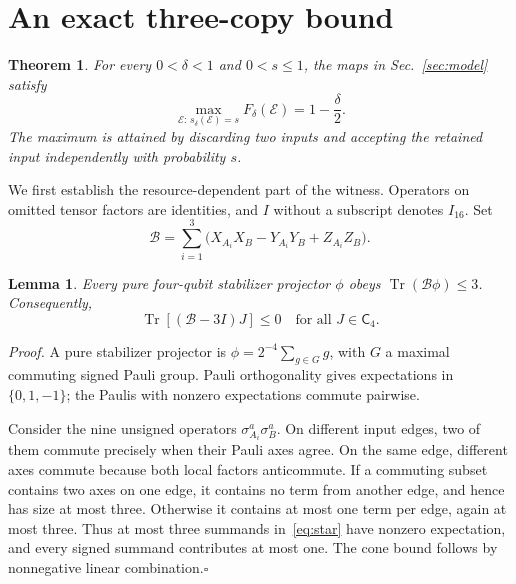 \documentclass[aps,pra,reprint,amsmath,amssymb,longbibliography,nofootinbib]{revtex4-2}
\newcommand{\Tr}{\operatorname{Tr}}
\newcommand{\cE}{\mathcal E}
\newcommand{\cB}{\mathcal B}
\newcommand{\Cs}{\mathsf C}
\newtheorem{theorem}{Theorem}
\newtheorem{lemma}{Lemma}
\begin{document}
\section{An exact three-copy bound}
\label{sec:proof}

\begin{theorem}
\label{thm:main}
For every $0<\delta<1$ and $0<s\leq1$, the maps in Sec.~\ref{sec:model} satisfy
\begin{equation}
 \max_{\cE:\,s_\delta(\cE)=s}F_\delta(\cE)=1-\frac{\delta}{2}.
 \label{eq:optimum}
\end{equation}
The maximum is attained by discarding two inputs and accepting the retained input independently with probability $s$.
\end{theorem}

We first establish the resource-dependent part of the witness. Operators on omitted tensor factors are identities, and $I$ without a subscript denotes $I_{16}$. Set
\begin{equation}
 \cB=\sum_{i=1}^3
 \bigl(X_{A_i}X_B-Y_{A_i}Y_B+Z_{A_i}Z_B\bigr).
 \label{eq:star}
\end{equation}

\begin{lemma}
\label{lem:star}
Every pure four-qubit stabilizer projector $\phi$ obeys $\Tr(\cB\phi)\leq3$. Consequently,
\begin{equation}
 \Tr[(\cB-3I)J]\leq0\quad\text{for all }J\in\Cs_4.
 \label{eq:starcone}
\end{equation}
\end{lemma}

\emph{Proof.}
A pure stabilizer projector is $\phi=2^{-4}\sum_{g\in G}g$, with $G$ a maximal commuting signed Pauli group. Pauli orthogonality gives expectations in $\{0,1,-1\}$; the Paulis with nonzero expectations commute pairwise.

Consider the nine unsigned operators $\sigma^a_{A_i}\sigma^a_B$. On different input edges, two of them commute precisely when their Pauli axes agree. On the same edge, different axes commute because both local factors anticommute. If a commuting subset contains two axes on one edge, it contains no term from another edge, and hence has size at most three. Otherwise it contains at most one term per edge, again at most three. Thus at most three summands in~\eqref{eq:star} have nonzero expectation, and every signed summand contributes at most one. The cone bound follows by nonnegative linear combination.\hfill$\square$
\end{document}
